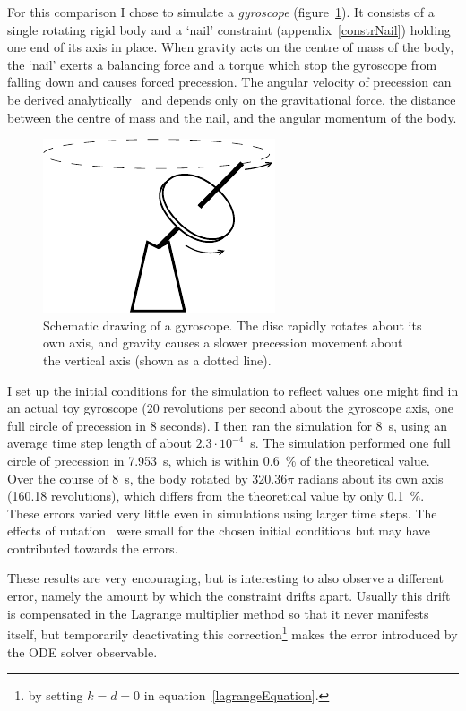 For this comparison I chose to simulate a \emph{gyroscope} (figure~\ref{gyroscope}). It consists
of a single rotating rigid body and a `nail' constraint (appendix~\ref{constrNail}) holding one
end of its axis in place. When gravity acts on the centre of mass of the body, the `nail' exerts
a balancing force and a torque which stop the gyroscope from falling down and causes forced
precession. The angular velocity of precession can be derived analytically~\cite{Julian:notes}
and depends only on the gravitational force, the distance between the centre of mass and the
nail, and the angular momentum of the body.

\begin{figure}
\centerline{\includegraphics{figures/gyroscope}}
\caption{Schematic drawing of a gyroscope. The disc rapidly rotates about its own axis, and
    gravity causes a slower precession movement about the vertical axis (shown as a dotted line).
    \label{gyroscope}}
\end{figure}

I set up the initial conditions for the simulation to reflect values one might find in an actual
toy gyroscope (20 revolutions per second about the gyroscope axis, one full circle of precession
in 8 seconds). I then ran the simulation for 8~s, using an average time step length of about
$2.3\cdot 10^{-4}$~s. The simulation performed one full circle of precession in 7.953~s, which
is within 0.6~\% of the theoretical value. Over the course of 8~s, the body rotated by $320.36\pi$
radians about its own axis (160.18 revolutions), which differs from the theoretical value by only
0.1~\%. These errors varied very little even in simulations using larger time steps.
The effects of nutation~\cite{Feynman:63} were small for the chosen initial conditions but may
have contributed towards the errors.

These results are very encouraging, but is interesting to also observe a different error, namely
the amount by which the constraint drifts apart. Usually this drift is compensated in the Lagrange
multiplier method so that it never manifests itself, but temporarily deactivating this
correction\footnote{by setting $k=d=0$ in equation~\ref{lagrangeEquation}.} makes the error
introduced by the ODE solver observable.

